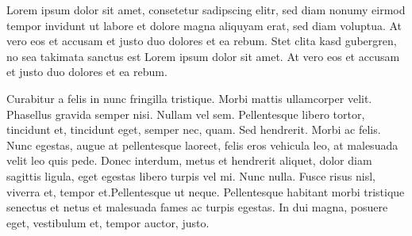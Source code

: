 Lorem ipsum dolor sit amet, consetetur sadipscing elitr, sed diam nonumy eirmod tempor invidunt ut labore et dolore magna aliquyam erat, sed diam voluptua. At vero eos et accusam et justo duo dolores et ea rebum. Stet clita kasd gubergren, no sea takimata sanctus est Lorem ipsum dolor sit amet. At vero eos et accusam et justo duo dolores et ea rebum.

Curabitur a felis in nunc fringilla tristique. Morbi mattis ullamcorper velit. Phasellus gravida semper nisi. Nullam vel sem. Pellentesque libero tortor, tincidunt et, tincidunt eget, semper nec, quam. Sed hendrerit. Morbi ac felis. Nunc egestas, augue at pellentesque laoreet, felis eros vehicula leo, at malesuada velit leo quis pede. Donec interdum, metus et hendrerit aliquet, dolor diam sagittis ligula, eget egestas libero turpis vel mi. Nunc nulla. Fusce risus nisl, viverra et, tempor et.Pellentesque ut neque. Pellentesque habitant morbi tristique senectus et netus et malesuada fames ac turpis egestas. In dui magna, posuere eget, vestibulum et, tempor auctor, justo. 

